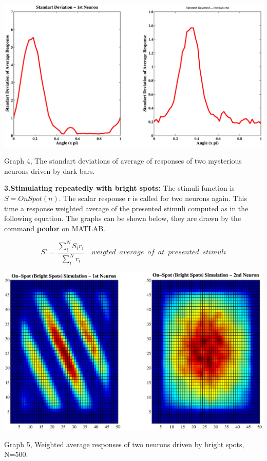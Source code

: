\documentclass{article}
\begin{document}
\begin{center}
 \includegraphics[width=\textwidth]{std_off.eps}
\begin{footnotesize}Graph 4, The standart deviations of average of responses of two mysterious neurons driven by dark bars. \end{footnotesize}
\end{center}

\setcounter{tocdepth}{1}
\textbf{3.Stimulating repeatedly with bright spots:} The stimuli function is $S=OnSpot(n)$. The scalar response r is called for two neurons again. This time a response weighted average of the presented stimuli computed as in the following equation. The graphs can be shown below, they are drawn by the command \textbf{pcolor} on MATLAB. 

\begin{equation}
 S'=\frac{\sum\limits_{i}^{N}S_ir_i}{\sum\limits_{i}^{N}r_i}\,\,\,\,\,\,{weigted\,\,\,average\,\,\,of\,\,\,at\,\,\,presented \,\,\,stimuli}
\end{equation}

\begin{center}
 \includegraphics[width=\textwidth]{onspot.eps}
\begin{footnotesize}Graph 5, Weighted average responses of two neurons driven by bright spots, N=500. \end{footnotesize}
\end{center}
\end{document}
